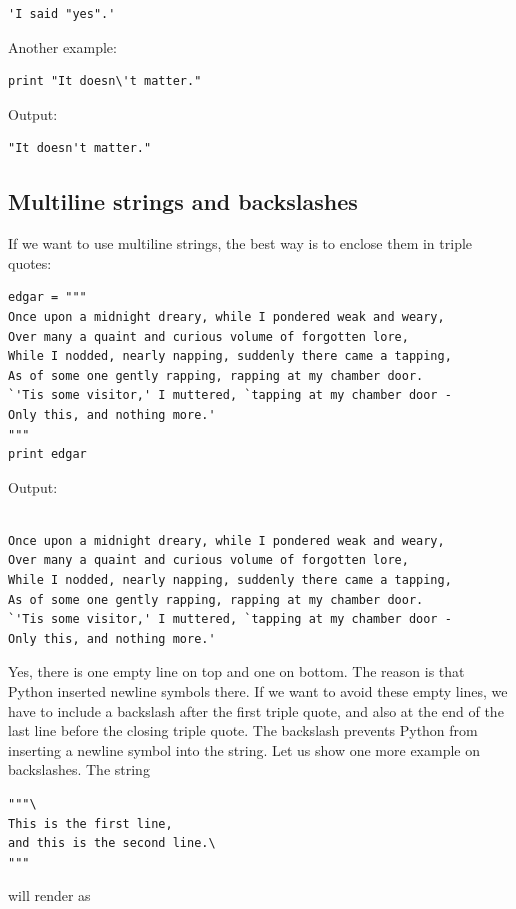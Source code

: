 \begin{verbatim}
'I said "yes".'
\end{verbatim}
Another example:

\begin{verbatim}
print "It doesn\'t matter."
\end{verbatim}
Output:

\begin{verbatim}
"It doesn't matter."
\end{verbatim}

\subsection{Multiline strings and backslashes}

If we want to use multiline strings, the best way is to enclose them 
in triple quotes: 

\begin{verbatim}
edgar = """
Once upon a midnight dreary, while I pondered weak and weary,
Over many a quaint and curious volume of forgotten lore,
While I nodded, nearly napping, suddenly there came a tapping,
As of some one gently rapping, rapping at my chamber door.
`'Tis some visitor,' I muttered, `tapping at my chamber door -
Only this, and nothing more.'
"""
print edgar
\end{verbatim}
Output:

\begin{verbatim}

Once upon a midnight dreary, while I pondered weak and weary,
Over many a quaint and curious volume of forgotten lore,
While I nodded, nearly napping, suddenly there came a tapping,
As of some one gently rapping, rapping at my chamber door.
`'Tis some visitor,' I muttered, `tapping at my chamber door -
Only this, and nothing more.'

\end{verbatim}
Yes, there is one empty line on top and one on bottom. The reason is that 
Python inserted newline symbols there. If we want to avoid these empty lines, 
we have to include a backslash after the first triple quote, and also at the 
end of the last line before the closing triple quote. The backslash prevents 
Python from inserting a newline symbol into the string. Let us show one more 
example on backslashes. The string 

\begin{verbatim}
"""\
This is the first line,
and this is the second line.\
""" 
\end{verbatim}
will render as

